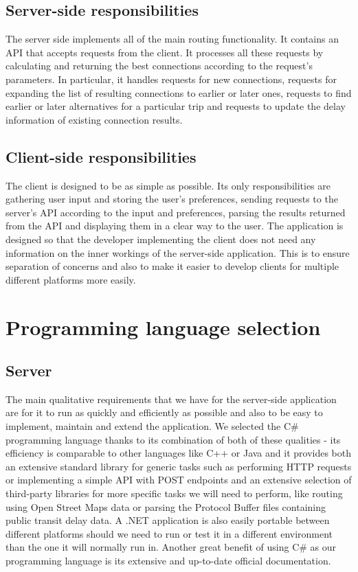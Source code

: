 \subsection{Server-side responsibilities}

The server side implements all of the main routing functionality. It contains an API that accepts requests from the client. It processes all these requests by calculating and returning the best connections according to the request's parameters. In particular, it handles requests for new connections, requests for expanding the list of resulting connections to earlier or later ones, requests to find earlier or later alternatives for a particular trip and requests to update the delay information of existing connection results. 

\subsection{Client-side responsibilities}

The client is designed to be as simple as possible. Its only responsibilities are gathering user input and storing the user's preferences, sending requests to the server's API according to the input and preferences, parsing the results returned from the API and displaying them in a clear way to the user. The application is designed so that the developer implementing the client does not need any information on the inner workings of the server-side application. This is to ensure separation of concerns and also to make it easier to develop clients for multiple different platforms more easily.



\section{Programming language selection}
\label{subsec:programming_language}

\subsection{Server}

The main qualitative requirements that we have for the server-side application are for it to run as quickly and efficiently as possible and also to be easy to implement, maintain and extend the application. We selected the C\# programming language thanks to its combination of both of these qualities - its efficiency is comparable to other languages like C++ or Java and it provides both an extensive standard library for generic tasks such as performing HTTP requests or implementing a simple API with POST endpoints and an extensive selection of third-party libraries for more specific tasks we will need to perform, like routing using Open Street Maps data or parsing the Protocol Buffer files containing public transit delay data. A .NET application is also easily portable between different platforms should we need to run or test it in a different environment than the one it will normally run in. Another great benefit of using C\# as our programming language is its extensive and up-to-date official documentation.

